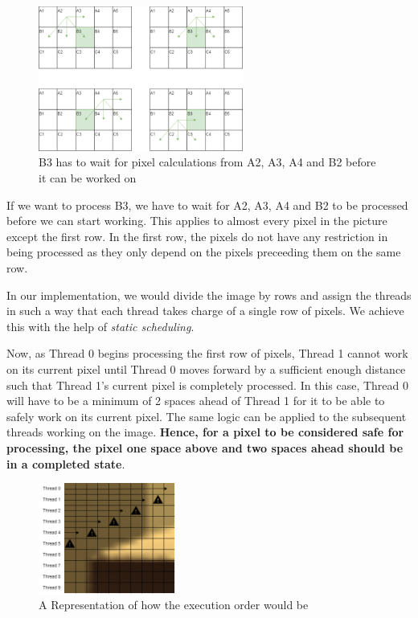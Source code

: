 \documentclass{article}
\begin{document}
\begin{figure}[H]
    \centering
    \includegraphics[width=0.6\textwidth]{images/Floyd_process.png}
    \caption{B3 has to wait for pixel calculations from A2, A3, A4 and B2 before it can be worked on}
    \label{fig:process_sketch}
\end{figure}

\noindent If we want to process B3, we have to wait for A2, A3, A4 and B2 to be processed before we can start working. This applies to almost every pixel in the picture except the first row. In the first row, the pixels do not have any restriction in being processed as they only depend on the pixels preceeding them on the same row.

\medskip
\noindent In our implementation, we would divide the image by rows and assign the threads in such a way that each thread takes charge of a single row of pixels. We achieve this with the help of \textit{static scheduling}.

\medskip
\noindent Now, as Thread 0 begins processing the first row of pixels, Thread 1 cannot work on its current pixel until Thread 0 moves forward by a sufficient enough distance such that Thread 1's current pixel is completely processed. In this case, Thread 0 will have to be a minimum of 2 spaces ahead of Thread 1 for it to be able to safely work on its current pixel. The same logic can be applied to the subsequent threads working on the image. \textbf{Hence, for a pixel to be considered safe for processing, the pixel one space above and two spaces ahead should be in a completed state}.

\begin{figure}[h]
    \centering
    \includegraphics[width=0.4\textwidth]{images/parallel_floyd2.png}
    \caption{A Representation of how the execution order would be}
    \label{fig:cornell_box2}
\end{figure}
\end{document}

